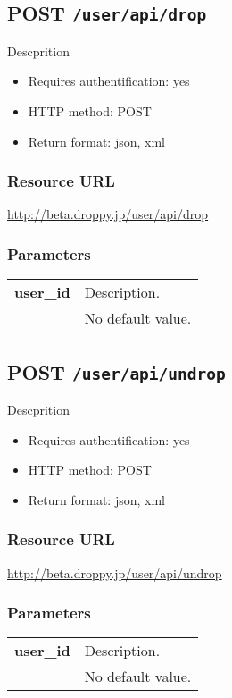 \documentclass[11pt,a4paper]{article}
\newcommand{\content}[1]{\begin{minipage}{10cm}\vspace{2mm}#1\vspace{2mm}\end{minipage}}
\begin{document}
      \newpage
      
      
  \subsection*{POST {\tt /user/api/drop}}
  Descprition
  \begin{itemize}
  \item Requires authentification: yes
  \item HTTP method: POST
  \item Return format: json, xml
  \end{itemize}
  \subsubsection*{Resource URL}
  \url{http://beta.droppy.jp/user/api/drop}
  \subsubsection*{Parameters}
  \begin{table}[h]
    \begin{center}
      \begin{tabular}{l l}
        \hline 
      \textbf{user\_id} & \content{Description. }
      \\
       & No default value.\\
      \hline
      \end{tabular}
    \end{center}
  \end{table}
  
      \newpage
      
      
  \subsection*{POST {\tt /user/api/undrop}}
  Descprition
  \begin{itemize}
  \item Requires authentification: yes
  \item HTTP method: POST
  \item Return format: json, xml
  \end{itemize}
  \subsubsection*{Resource URL}
  \url{http://beta.droppy.jp/user/api/undrop}
  \subsubsection*{Parameters}
  \begin{table}[h]
    \begin{center}
      \begin{tabular}{l l}
        \hline 
      \textbf{user\_id} & \content{Description. }
      \\
       & No default value.\\
      \hline
      \end{tabular}
    \end{center}
  \end{table}
  
\end{document}
